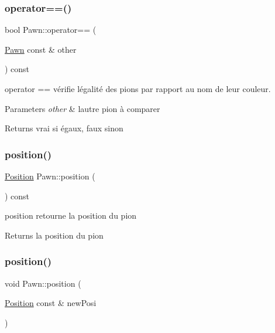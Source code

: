\subsubsection{\texorpdfstring{operator==()}{operator==()}}
{\footnotesize\ttfamily bool Pawn\+::operator== (\begin{DoxyParamCaption}\item[{\mbox{\hyperlink{class_pawn}{Pawn}} const \&}]{other }\end{DoxyParamCaption}) const\hspace{0.3cm}{\ttfamily [inline]}}



operator == vérifie l\textquotesingle{}égalité des pions par rapport au nom de leur couleur. 


\begin{DoxyParams}{Parameters}
{\em other} & l\textquotesingle{}autre pion à comparer \\
\hline
\end{DoxyParams}
\begin{DoxyReturn}{Returns}
vrai si égaux, faux sinon 
\end{DoxyReturn}
\mbox{\label{class_pawn_a917893aff236c2a13343ebda87c423e2}} 
\subsubsection{\texorpdfstring{position()}{position()}\hspace{0.1cm}{\footnotesize\ttfamily [1/2]}}
{\footnotesize\ttfamily \mbox{\hyperlink{class_position}{Position}} Pawn\+::position (\begin{DoxyParamCaption}{ }\end{DoxyParamCaption}) const\hspace{0.3cm}{\ttfamily [inline]}}



position retourne la position du pion 

\begin{DoxyReturn}{Returns}
la position du pion 
\end{DoxyReturn}
\mbox{\label{class_pawn_a6a8646ce4ad7aa5291544ffb1127783f}} 
\subsubsection{\texorpdfstring{position()}{position()}\hspace{0.1cm}{\footnotesize\ttfamily [2/2]}}
{\footnotesize\ttfamily void Pawn\+::position (\begin{DoxyParamCaption}\item[{\mbox{\hyperlink{class_position}{Position}} const \&}]{new\+Posi }\end{DoxyParamCaption})\hspace{0.3cm}{\ttfamily [inline]}}



